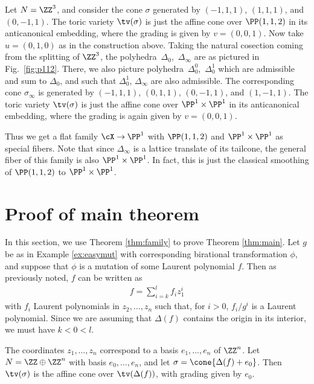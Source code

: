 \begin{Example}\label{ex:p112}
Let $N=\ZZ^3$, and consider the cone $\sigma$ generated by $(-1,1,1)$, $(1,1,1)$, and $(0,-1,1)$.
The toric variety $\tv(\sigma)$ is just the af\/f\/ine cone over $\PP(1,1,2)$ in its anticanonical embedding, where the grading is given by $v=(0,0,1)$. Now take $u=(0,1,0)$ as in the construction above. Taking the natural cosection coming from the splitting of $\ZZ^3$, the polyhedra~$\Delta_0$,~$\Delta_\infty$ are as pictured in Fig.~\ref{fig:p112}. There, we also picture polyhedra~$\Delta_0^0$,~$\Delta_0^1$ which are admissible and sum to $\Delta_0$, and such that $\Delta_0^1$, $\Delta_\infty$ are also admissible.
The corresponding cone $\sigma_\infty$ is generated by $(-1,1,1)$, $(0,1,1)$, $(0,-1,1)$, and $(1,-1,1)$. The toric variety $\tv(\sigma)$ is just the af\/f\/ine cone over $\PP^1\times\PP^1$ in its anticanonical embedding, where the grading is again given by $v=(0,0,1)$.

Thus we get a f\/lat family $\cX\to\PP^1$ with $\PP(1,1,2)$ and  $\PP^1\times\PP^1$ as special f\/ibers. Note that since $\Delta_\infty$ is a lattice translate of its tailcone, the general f\/iber of this family is also $\PP^1\times\PP^1$. In fact, this is just the classical smoothing of $\PP(1,1,2)$ to $\PP^1\times\PP^1$.
\end{Example}

\section{Proof of main theorem}\label{sec:main}

In this section, we use Theorem \ref{thm:family} to prove Theorem \ref{thm:main}. Let $g$ be as in Example \ref{ex:easymut} with corresponding birational transformation $\phi$, and suppose that $\phi$ is a mutation of some Laurent polynomial $f$. Then as previously noted,
$f$ can be written as
\begin{gather*}
f=\sum_{i=k}^l f_i z_1^i
\end{gather*}
with $f_i$ Laurent polynomials in $z_2,\ldots,z_n$ such that, for $i>0$, $f_i/g^i$ is a Laurent polynomial. Since we are assuming that $\Delta(f)$ contains the origin in its interior, we must have $k<0<l$.


The coordinates $z_1,\ldots,z_n$ correspond to a basis $e_1,\ldots,e_n$ of $\ZZ^n$.
Let $N=\ZZ\oplus \ZZ^n$ with basis $e_0,\ldots,e_n$, and let $\sigma=\cone\{\Delta(f)+e_0\}$. Then $\tv(\sigma)$ is the af\/f\/ine cone over $\tv(\Delta(f))$, with grading given by $e_0$.

